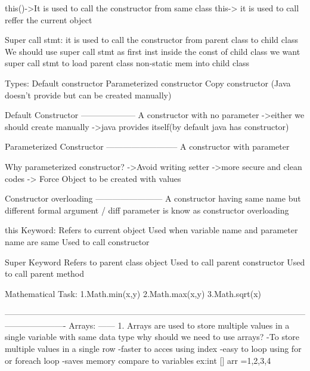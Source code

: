                         this()->It is used to call the constructor from same class
                        this-> it is used to call reffer the current object


               Super call stmt:
                        it is used  to call the constructor from parent class to child class
                        We should use super call stmt as first inst inside the const of child class
                        we want super call stmt to load parent class non-static mem into child class
                        
                        
                        

                        


               Types:
                  Default constructor
                  Parameterized constructor
                  Copy constructor (Java doesn’t provide but can be created manually)

               Default Constructor
               --------------------
                           A constructor with no parameter
                           ->either we should create manually 
                           ->java provides itself(by default java has constructor)

               Parameterized Constructor
               --------------------------
                            A constructor with parameter

                            Why parameterized constructor?
                            ->Avoid writing setter
                            ->more secure and  clean codes
                            -> Force Object to be created with values
               
               Constructor overloading
               ------------------------
                             A constructor having same name but different formal argument / diff parameter is know as constructor overloading


this Keyword:
Refers to current object
Used when variable name and parameter name are same
Used to call constructor

Super Keyword 
Refers to parent class object
Used to call parent constructor
Used to call parent method

Mathematical Task:
 1.Math.min(x,y)
 2.Math.max(x,y)
 3.Math.sqrt(x)
 
----------------------------------------------------------------------------------------------------------------------------------
Arrays:
------
    1.  Arrays are used to store multiple values in a single variable with same data type 
        why should we need to use arrays?
          -To store multiple values in a single row
          -faster to acces using index
          -easy to loop using for or foreach loop
          -saves memory compare to variables
   ex:int [] arr ={1,2,3,4}


